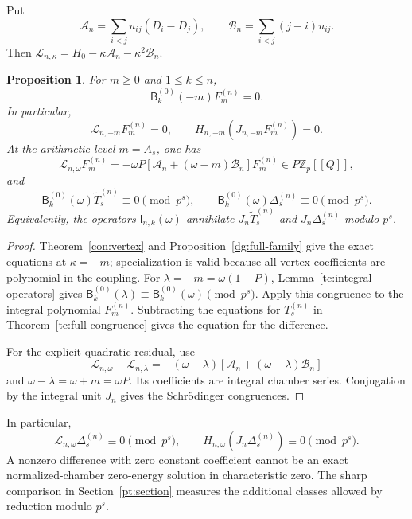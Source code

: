 \documentclass[11pt]{amsart}
\newtheorem{proposition}[theorem]{Proposition}
\theoremstyle{definition}
\theoremstyle{remark}
\numberwithin{equation}{section}
\newcommand{\Z}{\mathbb Z}
\begin{document}
Put
\[
 \mathcal A_n=\sum_{i<j}u_{ij}(D_i-D_j),\qquad
 \mathcal B_n=\sum_{i<j}(j-i)u_{ij}.
\]
Then $\mathcal L_{n,\kappa}=H_0-\kappa\mathcal A_n
-\kappa^2\mathcal B_n$.

\begin{proposition}\label{pt:energy-comparison}\label{pt:joint-comparison}
For $m\geq0$ and $1\leq k\leq n$,
\begin{equation}\label{pt:exact-joint-polynomial}
 \mathsf B_k^{(0)}(-m)F_m^{(n)}=0.
\end{equation}
In particular,
\begin{equation}\label{pt:shifted-equation}
 \mathcal L_{n,-m}F_m^{(n)}=0,\qquad
 H_{n,-m}(J_{n,-m}F_m^{(n)})=0.
\end{equation}
At the arithmetic level $m=A_s$, one has
\begin{equation}\label{pt:fixed-coupling-residual}
 \mathcal L_{n,\omega}F_m^{(n)}
 =-\omega P\left[\mathcal A_n+(\omega-m)\mathcal B_n\right]F_m^{(n)}
 \in P\Z_p[[Q]],
\end{equation}
and
\begin{equation}\label{pt:joint-congruences}
 \mathsf B_k^{(0)}(\omega)\widetilde T_s^{(n)}\equiv0\pmod{p^s},
 \qquad
 \mathsf B_k^{(0)}(\omega)\Delta_s^{(n)}\equiv0\pmod{p^s}.
\end{equation}
Equivalently, the operators $\mathsf I_{n,k}(\omega)$ annihilate
$J_n\widetilde T_s^{(n)}$ and $J_n\Delta_s^{(n)}$ modulo $p^s$.
\end{proposition}

\begin{proof}
Theorem~\ref{con:vertex} and Proposition~\ref{dg:full-family}
give the exact equations at $\kappa=-m$; specialization is valid
because all vertex coefficients are polynomial in the coupling.
For $\lambda=-m=\omega(1-P)$, Lemma~\ref{tc:integral-operators}
gives
$\mathsf B_k^{(0)}(\lambda)\equiv
\mathsf B_k^{(0)}(\omega)\pmod{p^s}$.
Apply this congruence to the integral polynomial $F_m^{(n)}$.
Subtracting the equations for $T_s^{(n)}$ in
Theorem~\ref{tc:full-congruence} gives the equation for the
difference.

For the explicit quadratic residual, use
\[
 \mathcal L_{n,\omega}-\mathcal L_{n,\lambda}
 =-(\omega-\lambda)
    [\mathcal A_n+(\omega+\lambda)\mathcal B_n]
\]
and $\omega-\lambda=\omega+m=\omega P$.
Its coefficients are integral chamber series. Conjugation by
the integral unit $J_n$ gives the Schr\"odinger congruences.
\end{proof}

In particular,
\begin{equation}\label{pt:modular-kernel}
 \mathcal L_{n,\omega}\Delta_s^{(n)}\equiv0\pmod{p^s},\qquad
 H_{n,\omega}(J_n\Delta_s^{(n)})\equiv0\pmod{p^s}.
\end{equation}
A nonzero difference with zero constant coefficient cannot be an
exact normalized-chamber zero-energy solution in characteristic
zero. The sharp comparison in Section~\ref{pt:section} measures
the additional classes allowed by reduction modulo $p^s$.
\end{document}
